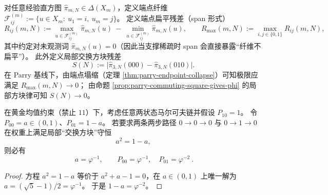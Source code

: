 \begin{definition}[端点扁平残差与局部交换方块残差]\label{def:endpoint-flatness-square-residue}
对任意经验直方图 \(\hat\pi_{m,N}\in\Delta(X_m)\)，定义端点纤维
\(
\mathcal{F}_{ij}^{(m)}:=\{u\in X_m:\ u_1=i,\ u_m=j\}
\)。
定义端点扁平残差（span 形式）
\[
R_{ij}(m,N):=\max_{u\in \mathcal{F}_{ij}^{(m)}}\hat\pi_{m,N}(u)\ -\ \min_{u\in \mathcal{F}_{ij}^{(m)}}\hat\pi_{m,N}(u),
\qquad
R_{\max}(m,N):=\max_{i,j\in\{0,1\}}R_{ij}(m,N),
\]
其中约定对未观测词 \(\hat\pi_{m,N}(u)=0\)（因此当支撑稀疏时 span 会直接暴露“纤维不扁平”）。
此外定义局部交换方块残差
\[
S(N):=\bigl|\hat\pi_{3,N}(000)-\hat\pi_{3,N}(010)\bigr|.
\]
在 Parry 基线下，由端点塌缩（定理 \ref{thm:parry-endpoint-collapse}）可知极限应满足 \(R_{\max}(m,N)\to 0\)；
由命题 \ref{prop:parry-commuting-square-gives-phi} 的局部方块律可知 \(S(N)\to 0\)。
\end{definition}

\begin{proposition}[局部交换方块 \texorpdfstring{$\Rightarrow$}{=>} 黄金转移概率]\label{prop:parry-commuting-square-gives-phi}
在黄金均值约束（禁止 \(11\)）下，考虑任意两状态马尔可夫链并假设 \(P_{10}=1\)。
令 \(P_{00}=a\in(0,1)\)、\(P_{01}=1-a\)。
若要求两条两步路径 \(0\to0\to0\) 与 \(0\to1\to0\) 在权重上满足局部“交换方块”守恒
\[
a^2=1-a,
\]
则必有
\[
\boxed{\ a=\varphi^{-1},\qquad P_{00}=\varphi^{-1},\quad P_{01}=\varphi^{-2}\ }.
\]
\end{proposition}
\begin{proof}
方程 \(a^2=1-a\) 等价于 \(a^2+a-1=0\)，在 \(a\in(0,1)\) 上唯一解为 \(a=(\sqrt5-1)/2=\varphi^{-1}\)。
于是 \(1-a=\varphi^{-2}\)。
\end{proof}
